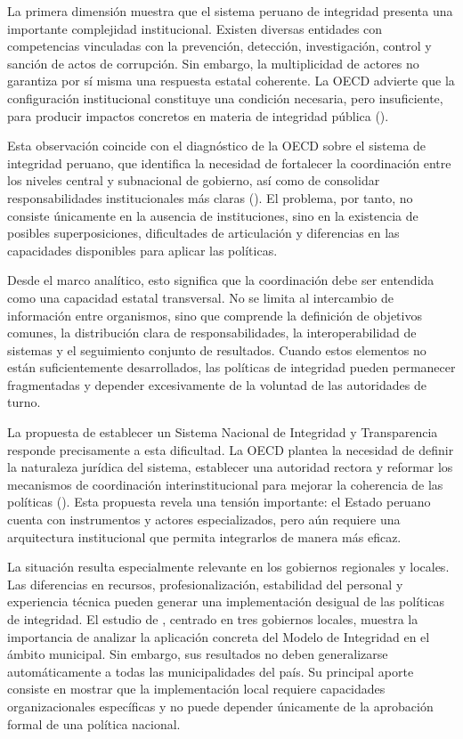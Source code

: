 \documentclass[Afour,sageh,times]{sagej}
\begin{document}
La primera dimensión muestra que el sistema peruano de integridad presenta una importante complejidad institucional. Existen diversas entidades con competencias vinculadas con la prevención, detección, investigación, control y sanción de actos de corrupción. Sin embargo, la multiplicidad de actores no garantiza por sí misma una respuesta estatal coherente. La OECD advierte que la configuración institucional constituye una condición necesaria, pero insuficiente, para producir impactos concretos en materia de integridad pública (\citealp{oecd2024sistema}).

Esta observación coincide con el diagnóstico de la OECD sobre el sistema de integridad peruano, que identifica la necesidad de fortalecer la coordinación entre los niveles central y subnacional de gobierno, así como de consolidar responsabilidades institucionales más claras (\citealp{oecd2017integrity}). El problema, por tanto, no consiste únicamente en la ausencia de instituciones, sino en la existencia de posibles superposiciones, dificultades de articulación y diferencias en las capacidades disponibles para aplicar las políticas.

Desde el marco analítico, esto significa que la coordinación debe ser entendida como una capacidad estatal transversal. No se limita al intercambio de información entre organismos, sino que comprende la definición de objetivos comunes, la distribución clara de responsabilidades, la interoperabilidad de sistemas y el seguimiento conjunto de resultados. Cuando estos elementos no están suficientemente desarrollados, las políticas de integridad pueden permanecer fragmentadas y depender excesivamente de la voluntad de las autoridades de turno.

La propuesta de establecer un Sistema Nacional de Integridad y Transparencia responde precisamente a esta dificultad. La OECD plantea la necesidad de definir la naturaleza jurídica del sistema, establecer una autoridad rectora y reformar los mecanismos de coordinación interinstitucional para mejorar la coherencia de las políticas (\citealp{oecd2024sistema}). Esta propuesta revela una tensión importante: el Estado peruano cuenta con instrumentos y actores especializados, pero aún requiere una arquitectura institucional que permita integrarlos de manera más eficaz.

La situación resulta especialmente relevante en los gobiernos regionales y locales. Las diferencias en recursos, profesionalización, estabilidad del personal y experiencia técnica pueden generar una implementación desigual de las políticas de integridad. El estudio de \citet{integridadmunicipal2025}, centrado en tres gobiernos locales, muestra la importancia de analizar la aplicación concreta del Modelo de Integridad en el ámbito municipal. Sin embargo, sus resultados no deben generalizarse automáticamente a todas las municipalidades del país. Su principal aporte consiste en mostrar que la implementación local requiere capacidades organizacionales específicas y no puede depender únicamente de la aprobación formal de una política nacional.
\end{document}
